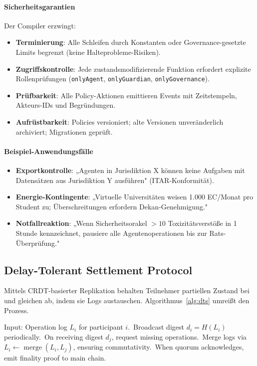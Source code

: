 \documentclass[11pt]{article}
\begin{document}
\paragraph{Sicherheitsgarantien} Der Compiler erzwingt:
\begin{itemize}[noitemsep]
  \item \textbf{Terminierung}: Alle Schleifen durch Konstanten oder Governance-gesetzte Limits begrenzt (keine Halteprobleme-Risiken).
  \item \textbf{Zugriffskontrolle}: Jede zustandsmodifizierende Funktion erfordert explizite Rollenprüfungen (\texttt{onlyAgent}, \texttt{onlyGuardian}, \texttt{onlyGovernance}).
  \item \textbf{Prüfbarkeit}: Alle Policy-Aktionen emittieren Events mit Zeitstempeln, Akteurs-IDs und Begründungen.
  \item \textbf{Aufrüstbarkeit}: Policies versioniert; alte Versionen unveränderlich archiviert; Migrationen geprüft.
\end{itemize}

\paragraph{Beispiel-Anwendungsfälle}
\begin{itemize}[noitemsep]
  \item \textbf{Exportkontrolle}: „Agenten in Jurisdiktion X können keine Aufgaben mit Datensätzen aus Jurisdiktion Y ausführen" (ITAR-Konformität).
  \item \textbf{Energie-Kontingente}: „Virtuelle Universitäten weisen 1.000 EC/Monat pro Student zu; Überschreitungen erfordern Dekan-Genehmigung."
  \item \textbf{Notfallreaktion}: „Wenn Sicherheitsorakel $>10$ Toxizitätsverstöße in 1 Stunde kennzeichnet, pausiere alle Agentenoperationen bis zur Rats-Überprüfung."
\end{itemize}

\subsection{Delay-Tolerant Settlement Protocol}
Mittels CRDT-basierter Replikation behalten Teilnehmer partiellen Zustand bei und gleichen ab, indem sie Logs austauschen. Algorithmus~\ref{alg:dts} umreißt den Prozess.

\begin{algorithm}[H]
  \caption{Delay-Tolerant Settlement (DTS)}
  \label{alg:dts}
  \begin{algorithmic}[1]
    \STATE Input: Operation log $L_i$ for participant $i$.\
    \STATE Broadcast digest $d_i = H(L_i)$ periodically.\
    \STATE On receiving digest $d_j$, request missing operations.\
    \STATE Merge logs via $L_i \leftarrow \operatorname{merge}(L_i, L_j)$, ensuring commutativity.\
    \STATE When quorum acknowledges, emit finality proof to main chain.\
  \end{algorithmic}
\end{algorithm}
\end{document}
